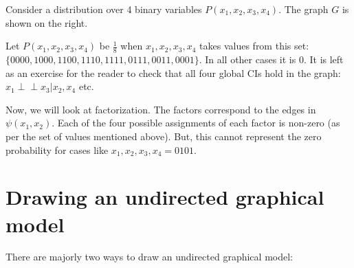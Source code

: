 \documentclass[a4paper]{article}
\begin{document}
\begin{minipage}{0.60\textwidth} 
    Consider a distribution over 4 binary variables $P(x_1, x_2, x_3, x_4)$. The graph $G$ is shown on the right. 

    Let $P(x_1, x_2, x_3, x_4)$ be $\frac{1}{8}$ when $x_1, x_2, x_3, x_4$ takes values from this set: $\{0000, 1000, 1100, 1110, 1111, 0111, 0011, 0001\}$. In all other cases it is 0. It is left as an exercise for the reader to check that all four global CIs hold in the graph: $x_1 \perp\!\!\!\perp x_3 | x_2, x_4$ etc.

    Now, we will look at factorization. The factors correspond to the edges in $\psi(x_1, x_2)$. Each of the four possible assignments of each factor is non-zero (as per the set of values mentioned above). But, this cannot represent the zero probability for cases like $x_1, x_2, x_3, x_4 = 0101$.
\end{minipage}
\hfill 
\begin{minipage}{0.30\textwidth} 
\end{minipage}


\section{Drawing an undirected graphical model}
There are majorly two ways to draw an undirected graphical model:
\end{document}
